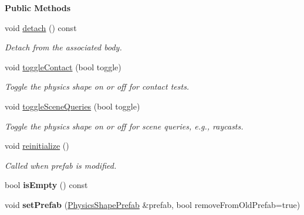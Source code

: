 \begin{Indent}\textbf{ Public Methods}\par
\begin{DoxyCompactItemize}
\item 
\mbox{\label{classrev_1_1_physics_shape_a49fe8fd19a588b4d595f7590a1d1b04b}} 
void \mbox{\hyperlink{classrev_1_1_physics_shape_a49fe8fd19a588b4d595f7590a1d1b04b}{detach}} () const
\begin{DoxyCompactList}\small\item\em Detach from the associated body. \end{DoxyCompactList}\item 
\mbox{\label{classrev_1_1_physics_shape_a10c03541676cd182f7144dd298c6953f}} 
void \mbox{\hyperlink{classrev_1_1_physics_shape_a10c03541676cd182f7144dd298c6953f}{toggle\+Contact}} (bool toggle)
\begin{DoxyCompactList}\small\item\em Toggle the physics shape on or off for contact tests. \end{DoxyCompactList}\item 
\mbox{\label{classrev_1_1_physics_shape_ae4345e4ffb7f882f14315e53466b042e}} 
void \mbox{\hyperlink{classrev_1_1_physics_shape_ae4345e4ffb7f882f14315e53466b042e}{toggle\+Scene\+Queries}} (bool toggle)
\begin{DoxyCompactList}\small\item\em Toggle the physics shape on or off for scene queries, e.\+g., raycasts. \end{DoxyCompactList}\item 
\mbox{\label{classrev_1_1_physics_shape_ac732c0fb5caef2829a1ae38307344a1f}} 
void \mbox{\hyperlink{classrev_1_1_physics_shape_ac732c0fb5caef2829a1ae38307344a1f}{reinitialize}} ()
\begin{DoxyCompactList}\small\item\em Called when prefab is modified. \end{DoxyCompactList}\item 
\mbox{\label{classrev_1_1_physics_shape_af14f17b2da23130c44f53f5ba7d43eda}} 
bool {\bfseries is\+Empty} () const
\item 
\mbox{\label{classrev_1_1_physics_shape_a5097d52b56dcecd10de6a45c1110ea76}} 
void {\bfseries set\+Prefab} (\mbox{\hyperlink{classrev_1_1_physics_shape_prefab}{Physics\+Shape\+Prefab}} \&prefab, bool remove\+From\+Old\+Prefab=true)
\end{DoxyCompactItemize}
\end{Indent}
